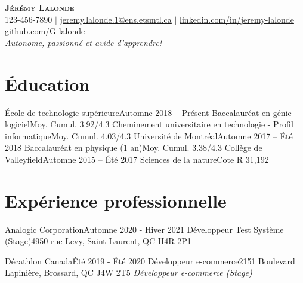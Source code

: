 \documentclass[letterpaper,11pt]{article}
\begin{document}
\begin{center}
  \textbf{\Huge \scshape Jérémy Lalonde} \\ \vspace{1pt}
  \small 123-456-7890 $|$ \href{mailto:jeremy.lalonde.1@ens.etsmtl.ca}{jeremy.lalonde.1@ens.etsmtl.ca} $|$ 
  \href{https://linkedin.com/in/jeremy-lalonde}{linkedin.com/in/jeremy-lalonde} $|$
  \href{https://github.com/G-lalonde}{github.com/G-lalonde} \\
  \textit{\small {Autonome, passionné et avide d'apprendre!}}
\end{center}

\section{Éducation}
  \resumeSubHeadingListStart
    \resumeSubheadingTwo 
      {École de technologie supérieure}{Automne 2018 -- Présent}
      {Baccalauréat en génie logiciel}{Moy. Cumul. 3.92/4.3}
      {Cheminement universitaire en technologie - Profil informatique}{Moy. Cumul. 4.03/4.3}
    \resumeSubheading
      {Université de Montréal}{Automne 2017 -- Été 2018}
      {Baccalauréat en physique (1 an)}{Moy. Cumul. 3.38/4.3}
    \resumeSubheading
      {Collège de Valleyfield}{Automne 2015 -- Été 2017}
      {Sciences de la nature}{Cote R 31,192}
  \resumeSubHeadingListEnd

\section{Expérience professionnelle}
  \resumeSubHeadingListStart

    \resumeSubheading
      {Analogic Corporation}{Automne 2020 - Hiver 2021}
      {Développeur Test Système (Stage)}{4950 rue Levy, Saint-Laurent, QC H4R 2P1}
      \resumeItemListStart
      \resumeItemListEnd

    \resumeSubheading
      {Décathlon Canada}{Été 2019 - Été 2020}
      {Développeur e-commerce}{2151 Boulevard Lapinière, Brossard, QC J4W 2T5}
      \resumeItemListStart
      \resumeItemListEnd
      \textit{\small {Développeur e-commerce (Stage)}}\vspace{-7pt}
        \resumeItemListStart
        \resumeItemListEnd
\end{document}
